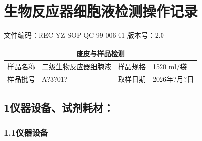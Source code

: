 \documentclass[UTF8,10pt,a4paper,fontset=fandol]{ctexart}
\newcommand{\fieldvalue}[1]{#1}
\newcommand{\handwritten}[1]{#1}
\begin{document}
\normalsize

\newpage

\section*{生物反应器细胞液检测操作记录}

\noindent
文件编码：REC-YZ-SOP-QC-99-006-01 \qquad 版本号：2.0

\begin{center}
\begin{tabular}{|p{3.0cm}|p{5.0cm}|p{2.5cm}|p{3.0cm}|}
\hline
\multicolumn{4}{|c|}{废皮与样品检测} \\
\hline
样品名称 &
\fieldvalue{二级生物反应器细胞液} &
样品规格 &
\fieldvalue{\handwritten{1520}} ml/袋
\\
\hline
样品批号 &
\fieldvalue{\handwritten{A?3?01?}} &
取样日期 &
\fieldvalue{\handwritten{2026年?月?日}}
\\
\hline
\end{tabular}
\end{center}

\subsection*{1\quad 仪器设备、试剂耗材：}

\subsubsection*{1.1\quad 仪器设备}
\end{document}
